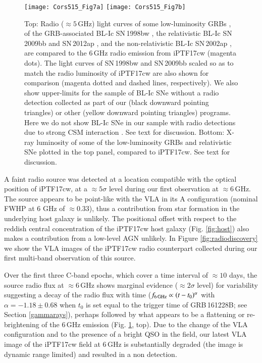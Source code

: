 \documentclass[twocolumn]{emulateapj}
\begin{document}
\begin{figure}
\vbox{
\texttt{[image: Cors515\_Fig7a]}
\texttt{[image: Cors515\_Fig7b]}
}
\caption{Top: Radio ($\approx 5$\,GHz) light curves of some low-luminosity GRBs \citep[blue;][]{Soderberg2004,Soderberg2006,Margutti2013}, of the GRB-associated BL-Ic SN\,1998bw \citep[red;][]{Kulkarni1998}, the relativistic BL-Ic SN\,2009bb \citep[green;][]{Soderberg2010} and SN\,2012ap \citep[yellow dot;][]{Cha2015}, and the non-relativistic BL-Ic SN\,2002ap \citep[yellow dot;][]{Berger2003}, are compared to the $6$\,GHz radio emission from iPTF17cw (magenta dots). The light curves of SN\,1998bw and SN\,2009bb scaled so as to match the radio luminosity of iPTF17cw are also shown for comparison (magenta dotted and dashed lines, respectively). We also show upper-limits for the sample of BL-Ic SNe without a radio detection collected as part of our (black downward pointing triangles) or other (yellow downward pointing triangles) programs. Here we do not show BL-Ic SNe in our sample with radio detections due to strong CSM interaction \citep{Corsi2014,Corsi2016}. See text for discussion. Bottom: X-ray luminosity of some of the low-luminosity GRBs \citep{Kouveliotou2004,Watson2004,Campana2006,Margutti2013} and relativistic SNe \citep{Soderberg2010} plotted in the top panel, compared to iPTF17cw. See text for discussion. \label{fig:radio}}
\end{figure}

 A faint radio source was 
detected at a location compatible with the optical position of iPTF17cw, at a $\approx 5\sigma$ level 
during our first observation at $\approx 6$\,GHz. The source appears to be point-like with the VLA in its A configuration (nominal FWHP at 6 GHz of $\approx 0.33$\arcsec), thus a contribution from star formation in the underlying host galaxy is unlikely. The positional offset with respect to the reddish central concentration of the iPTF17cw host galaxy (Fig. \ref{fig:host}) also makes a contribution from a low-level AGN unlikely. In Figure \ref{fig:radiodiscovery} we show the VLA images of the iPTF17cw radio counterpart collected during our first multi-band observation of this source.

Over the first three C-band epochs, which cover a time interval of $\approx 10$ days, the source radio flux at $\approx 6$\,GHz 
shows marginal evidence ($\approx 2\sigma$ level) for variability suggesting a decay of the radio flux with time ($f_{\rm 6\,GHz}\propto (t-t_0)^{\alpha}$ with $\alpha =-1.18\pm0.68$ when $t_0$ is set equal to the trigger time of GRB\,161228B; see Section \ref{gammarays}), perhaps followed by what appears to 
be a flattening or re-brightening of the 6\,GHz emission (Fig. \ref{fig:radio}, top). Due to the change of the VLA configuration and to the presence of a 
bright QSO in the field,  our latest VLA image of the iPTF17cw field at 6\,GHz is substantially degraded (the image is dynamic range limited) and resulted in a non detection. 
\end{document}
